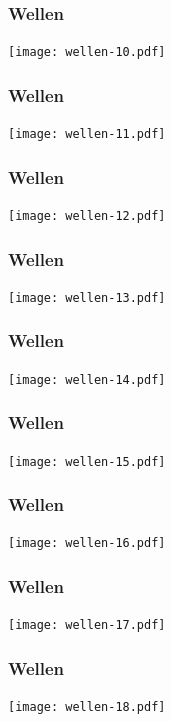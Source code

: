 \begin{frame}
\frametitle{Wellen}
\begin{center}
\texttt{[image: wellen-10.pdf]}
\end{center}
\end{frame}

\begin{frame}
\frametitle{Wellen}
\begin{center}
\texttt{[image: wellen-11.pdf]}
\end{center}
\end{frame}

\begin{frame}
\frametitle{Wellen}
\begin{center}
\texttt{[image: wellen-12.pdf]}
\end{center}
\end{frame}

\begin{frame}
\frametitle{Wellen}
\begin{center}
\texttt{[image: wellen-13.pdf]}
\end{center}
\end{frame}

\begin{frame}
\frametitle{Wellen}
\begin{center}
\texttt{[image: wellen-14.pdf]}
\end{center}
\end{frame}

\begin{frame}
\frametitle{Wellen}
\begin{center}
\texttt{[image: wellen-15.pdf]}
\end{center}
\end{frame}

\begin{frame}
\frametitle{Wellen}
\begin{center}
\texttt{[image: wellen-16.pdf]}
\end{center}
\end{frame}

\begin{frame}
\frametitle{Wellen}
\begin{center}
\texttt{[image: wellen-17.pdf]}
\end{center}
\end{frame}

\begin{frame}
\frametitle{Wellen}
\begin{center}
\texttt{[image: wellen-18.pdf]}
\end{center}
\end{frame}

